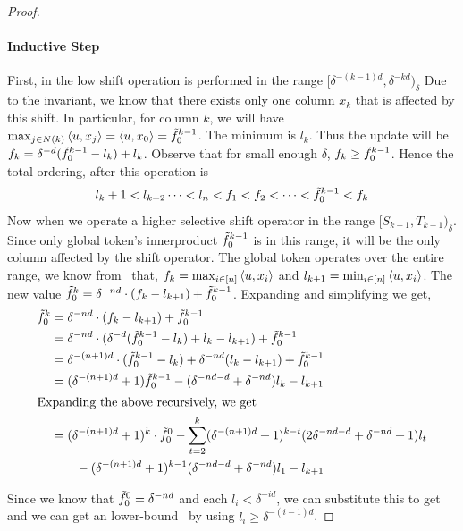 \begin{proof}
   \paragraph{ Inductive Step }
   First, in the low shift operation is performed in the range $[\delta^{-(k-1)d}, \delta^{-kd})_{\delta}$
   Due to the invariant, we know that there exists only one column $x_k$ that is affected by this shift. 
   In particular, for column $k$, we will have $\max_{j \in N(k)} \left \langle u, x_j \right \rangle = \left \langle u, x_{0} \right \rangle = \tilde{f}^{k-1}_0$. The minimum is $l_k$. Thus the update will be
   $f_k = \delta^{-d} ( \tilde{f}_0^{k-1} - l_k ) + l_k $.  Observe that for small enough $\delta$,
   $f_k \geq \tilde{f}_0^{k-1}$.  Hence the total ordering, after this operation is
    \begin{align}
        l_k+1 < l_{k+2} \dots < l_n < f_1 < f_2< \dots <  \tilde{f}_0^{k-1} < f_{k}  \label{eqn:intermediate}
    \end{align}
    Now when we operate a higher selective shift operator in the range $[S_{k-1},T_{k-1})_{\delta}$.  
    Since only global token's innerproduct  $\tilde{f}_0^{k-1}$ is in this range, 
    it will be the only column affected by the shift operator. The global token operates  over the entire range, we know from~ that,  $f_k = \max_{i \in [n]} \left \langle u, x_i \right \rangle$ and $l_{k+1} = \min_{i \in [n]} \left \langle u, x_i \right \rangle$. 
    The new value $\tilde{f}_0^k = \delta^{-nd} \cdot (f_k - l_{k+1} ) + \tilde{f}_0^{k-1}$. 
    Expanding and simplifying we get,  
    \begin{align*}
        \tilde{f}_0^k &= \delta^{-nd} \cdot (f_k - l_{k+1} ) + \tilde{f}_0^{k-1} \\
        &= \delta^{-nd} \cdot (   \delta^{-d} ( \tilde{f}_0^{k-1} - l_k ) + l_k - l_{k+1} ) + \tilde{f}_0^{k-1} \\
        &= \delta^{-(n+1)d} \cdot (    \tilde{f}_0^{k-1} - l_k )  +  \delta^{-nd}(l_k - l_{k+1}) + \tilde{f}_0^{k-1} \\
        &= (\delta^{-(n+1)d} + 1) \tilde{f}_0^{k-1} - (\delta^{-nd-d}  +  \delta^{-nd}) l_k - l_{k+1} \\
        \intertext{Expanding the above recursively, we get}
        &= (\delta^{-(n+1)d} + 1)^{k} \cdot \tilde{f}_0^{0} -  \sum_{t=2}^k  (\delta^{-(n+1)d} + 1)^{k-t}( 2\delta^{-nd-d}  +  \delta^{-nd} +1) l_t \\
         & \qquad -   (\delta^{-(n+1)d} + 1)^{k-1}(\delta^{-nd-d}  +  \delta^{-nd} )l_1  - l_{k+1}
         \end{align*}
         
    Since we know that $\tilde{f}_0^0 = \delta^{-nd}$ and each $l_i < \delta^{-id}$, we can substitute this to get~
    and we can get an lower-bound~ by using $l_i \geq \delta^{-(i-1)d} $. 
    

\end{proof}
